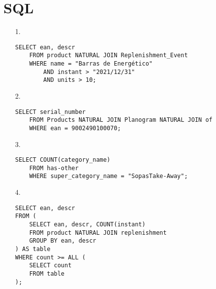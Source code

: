 \documentclass[12pt,a4paper]{report}
\begin{document}
\section*{SQL}
\begin{enumerate}
\item[1.]
\begin{verbatim}
SELECT ean, descr
    FROM product NATURAL JOIN Replenishment_Event
    WHERE name = "Barras de Energético"
        AND instant > "2021/12/31"
        AND units > 10;
\end{verbatim}
\item[2.]
\begin{verbatim}
SELECT serial_number
    FROM Products NATURAL JOIN Planogram NATURAL JOIN of
    WHERE ean = 9002490100070; 
\end{verbatim}

\item[3.]
\begin{verbatim}
SELECT COUNT(category_name)
    FROM has-other
    WHERE super_category_name = "SopasTake-Away";
\end{verbatim}

\item[4.]
  \begin{verbatim}
SELECT ean, descr
FROM (
    SELECT ean, descr, COUNT(instant)
    FROM product NATURAL JOIN replenishment
    GROUP BY ean, descr
) AS table
WHERE count >= ALL (
    SELECT count
    FROM table
);
    

\end{verbatim}
\end{enumerate}
\end{document}
